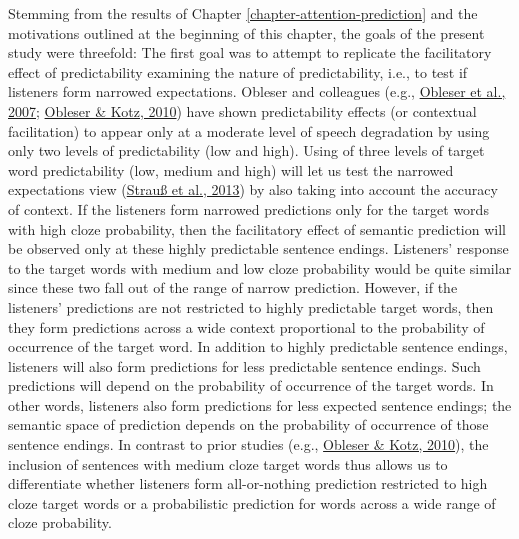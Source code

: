 \documentclass[a4paper, nobind]{templates/ociamthesis}
\begin{document}
Stemming from the results of Chapter \ref{chapter-attention-prediction} and the motivations outlined at the beginning of this chapter, the goals of the present study were threefold:
The first goal was to attempt to replicate the facilitatory effect of predictability examining the nature of predictability, i.e., to test if listeners form narrowed expectations.
Obleser and colleagues (e.g., \protect\hyperlink{ref-Obleser2007}{Obleser et al., 2007}; \protect\hyperlink{ref-Obleser2010}{Obleser \& Kotz, 2010}) have shown predictability effects (or contextual facilitation) to appear only at a moderate level of speech degradation by using only two levels of predictability (low and high).
Using of three levels of target word predictability (low, medium and high) will let us test the narrowed expectations view (\protect\hyperlink{ref-Strauss2013}{Strauß et al., 2013}) by also taking into account the accuracy of context.
If the listeners form narrowed predictions only for the target words with high cloze probability, then the facilitatory effect of semantic prediction will be observed only at these highly predictable sentence endings.
Listeners' response to the target words with medium and low cloze probability would be quite similar since these two fall out of the range of narrow prediction.
However, if the listeners' predictions are not restricted to highly predictable target words, then they form predictions across a wide context proportional to the probability of occurrence of the target word.
In addition to highly predictable sentence endings, listeners will also form predictions for less predictable sentence endings.
Such predictions will depend on the probability of occurrence of the target words.
In other words, listeners also form predictions for less expected sentence endings;
the semantic space of prediction depends on the probability of occurrence of those sentence endings.
In contrast to prior studies (e.g., \protect\hyperlink{ref-Obleser2010}{Obleser \& Kotz, 2010}), the inclusion of sentences with medium cloze target words thus allows us to differentiate whether listeners form all-or-nothing prediction restricted to high cloze target words or a probabilistic prediction for words across a wide range of cloze probability.
\end{document}
